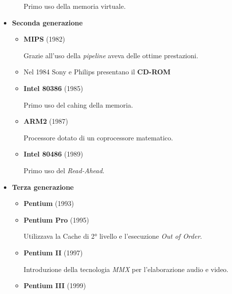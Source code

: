 \documentclass{article}
\begin{document}
\begin{itemize}
\begin{itemize}
                    Primo uso della memoria virtuale.\newline
                
            \end{itemize}

        \item \textbf{Seconda generazione}
            \begin{itemize}
                \item \textbf{MIPS} (1982)

                    Grazie all'uso della \textit{pipeline} aveva delle ottime prestazioni.

                \item Nel 1984 Sony e Philips presentano il \textbf{CD-ROM}

                \item \textbf{Intel 80386} (1985)

                    Primo uso del cahing della memoria.

                \item \textbf{ARM2} (1987)

                    Processore dotato di un coprocessore matematico.

                \item \textbf{Intel 80486} (1989)

                    Primo uso del \textit{Read-Ahead}.\newline
                
            \end{itemize}
            
        \item \textbf{Terza generazione}
            \begin{itemize}
                \item \textbf{Pentium} (1993)
                \item \textbf{Pentium Pro} (1995)

                    Utilizzava la Cache di 2° livello e l'esecuzione \textit{Out of Order}.

                \item \textbf{Pentium II} (1997)

                    Introduzione della tecnologia \textit{MMX} per l'elaborazione audio e video.

                \item \textbf{Pentium III} (1999)


\end{itemize}
\end{itemize}
\end{document}
